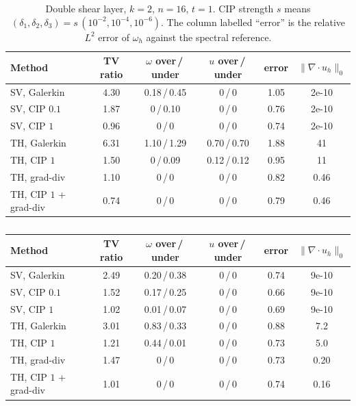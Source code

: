 \begin{table}[t]
  \centering\small
  \caption{Double shear layer, $k = 2$, $n = 16$, $t = 1$.
           CIP strength $s$ means
           $(\delta_1,\delta_2,\delta_3) = s\,(10^{-2},10^{-4},10^{-6})$.
           The column labelled ``error'' is the relative $L^2$ error of $\omega_h$
           against the spectral reference.}
  \label{tab:shear}
  \begin{tabular}{lccccc}
    \toprule
    Method & TV ratio & $\omega$ over\,/\,under & $u$ over\,/\,under & error & $\|\nabla\cdot u_h\|_0$ \\
    \midrule
    SV, Galerkin           & 4.30 & 0.18\,/\,0.45 & 0\,/\,0       & 1.05 & 2e-10 \\
    SV, CIP $0.1$          & 1.87 & 0\,/\,0.10    & 0\,/\,0       & 0.76 & 2e-10 \\
    SV, CIP $1$            & 0.96 & 0\,/\,0       & 0\,/\,0       & 0.74 & 2e-10 \\
    TH, Galerkin           & 6.31 & 1.10\,/\,1.29 & 0.70\,/\,0.70 & 1.88 & 41    \\
    TH, CIP $1$            & 1.50 & 0\,/\,0.09    & 0.12\,/\,0.12 & 0.95 & 11    \\
    TH, grad-div           & 1.10 & 0\,/\,0       & 0\,/\,0       & 0.82 & 0.46  \\
    TH, CIP $1$ + grad-div & 0.74 & 0\,/\,0       & 0\,/\,0       & 0.79 & 0.46  \\
    \bottomrule
  \end{tabular}
\end{table}

\begin{table}[t]
  \centering\small
  \caption{}
  \label{tab:shear32}
  \begin{tabular}{lccccc}
    \toprule
    Method & TV ratio & $\omega$ over\,/\,under & $u$ over\,/\,under & error & $\|\nabla\cdot u_h\|_0$ \\
    \midrule
    SV, Galerkin           & 2.49 & 0.20\,/\,0.38 & 0\,/\,0 & 0.74 & 9e-10 \\
    SV, CIP $0.1$          & 1.52 & 0.17\,/\,0.25 & 0\,/\,0 & 0.66 & 9e-10 \\
    SV, CIP $1$            & 1.02 & 0.01\,/\,0.07 & 0\,/\,0 & 0.69 & 9e-10 \\
    TH, Galerkin           & 3.01 & 0.83\,/\,0.33 & 0\,/\,0 & 0.88 & 7.2   \\
    TH, CIP $1$            & 1.21 & 0.44\,/\,0.01 & 0\,/\,0 & 0.73 & 5.0   \\
    TH, grad-div           & 1.47 & 0\,/\,0       & 0\,/\,0 & 0.73 & 0.20  \\
    TH, CIP $1$ + grad-div & 1.01 & 0\,/\,0       & 0\,/\,0 & 0.74 & 0.16  \\
    \bottomrule
  \end{tabular}
\end{table}

